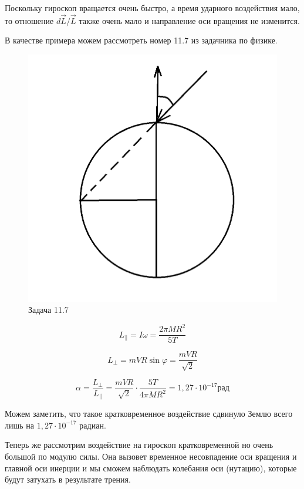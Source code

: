 \documentclass[12pt,a4paper]{article}
\begin{document}
Поскольку гироскоп вращается очень быстро, а время ударного воздействия мало, то отношение $d\overrightarrow{L} / \overrightarrow{L}$ также очень мало и направление оси вращения не изменится.

В качестве примера можем рассмотреть номер 11.7  из задачника по физике.

\begin{figure}[h!]
\centering
\includegraphics[scale=0.7]{11.7.png}
\caption{Задача 11.7}
\label{fig:Kick hyro}
\end{figure}

\[L_{\|} = I \omega = \frac{2\pi M R^2}{5T}\]

\[L_{\bot} = mVR\sin \varphi = \frac{mVR}{\sqrt{2}}\]

\[\alpha = \frac{L_{\bot}}{L_{\|}} = \frac{mVR}{\sqrt{2}} \cdot \frac{5T}{4\pi M R^2} = 1,27 \cdot 10^{-17} \textit{рад}\]

Можем заметить, что такое кратковременное воздействие сдвинуло Землю всего лишь на $1,27 \cdot 10^{-17}$ радиан.

Теперь же рассмотрим воздействие на гироскоп кратковременной но очень большой по модулю силы. Она вызовет временное несовпадение оси вращения и главной оси инерции и мы сможем наблюдать колебания оси (нутацию), которые будут затухать в результате трения.
\end{document}

